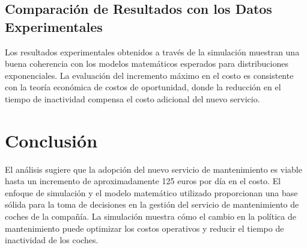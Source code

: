 \documentclass[a4paper,12pt]{article}
\begin{document}
    \subsection{Comparación de Resultados con los Datos Experimentales}\label{subsec:comparacion-de-resultados-con-los-datos-experimentales}

    Los resultados experimentales obtenidos a través de la simulación muestran una buena coherencia con los modelos matemáticos esperados para distribuciones exponenciales.
    La evaluación del incremento máximo en el costo es consistente con la teoría económica de costos de oportunidad, donde la reducción en el tiempo de inactividad compensa el costo adicional del nuevo servicio.


    \section{Conclusión}\label{sec:conclusion}

    El análisis sugiere que la adopción del nuevo servicio de mantenimiento es viable hasta un incremento de aproximadamente 125 euros por día en el costo.
    El enfoque de simulación y el modelo matemático utilizado proporcionan una base sólida para la toma de decisiones en la gestión del servicio de mantenimiento de coches de la compañía.
    La simulación muestra cómo el cambio en la política de mantenimiento puede optimizar los costos operativos y reducir el tiempo de inactividad de los coches.

    
    
\end{document}
